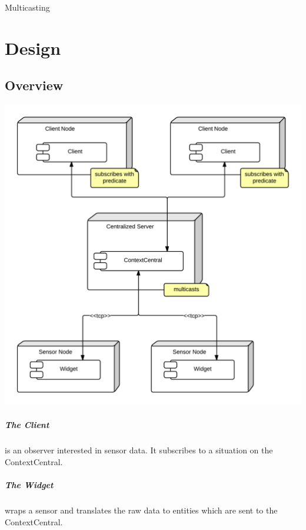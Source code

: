 \documentclass[]{report}
\begin{document}
Multicasting




\chapter{Design}




\section{Overview}

\begin{center}
\includegraphics[scale=0.2]{ComponentDiagram.png}
\end{center}


\paragraph{The Client} is an observer interested in sensor data. It subscribes to a situation on the ContextCentral.

\paragraph{The Widget} wraps a sensor and translates the raw data to entities which are sent to the ContextCentral.
\end{document}
